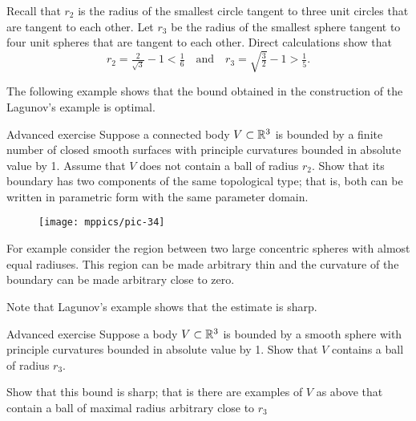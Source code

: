 Recall that $r_2$ is the radius of the smallest circle tangent to three unit circles that are tangent to each other.
Let $r_3$
be the radius of the smallest sphere tangent to four unit spheres that are tangent to each other.
Direct calculations show that 
\[r_2=\tfrac2{\sqrt{3}}-1< \tfrac16\quad\text{and}\quad r_3=\sqrt{\tfrac32}-1>\tfrac15.\]

The following example shows that the bound obtained in the construction of the Lagunov's example is optimal.

\begin{thm}{Advanced exercise}\label{ex:thin}
Suppose a connected body $V\subset \mathbb{R}^3$ is bounded by a finite number of closed smooth surfaces with principle curvatures bounded in absolute value by 1.
Assume that $V$ does not contain a ball of radius $r_2$.
Show that its boundary has two components of the same topological type; 
that is, both can be written in parametric form with the same parameter domain. 
\end{thm}

\begin{wrapfigure}{o}{33 mm}
\vskip-4mm
\centering
\texttt{[image: mppics/pic-34]}
\vskip0mm
\end{wrapfigure}

For example consider the region between two large concentric spheres with almost equal radiuses. 
This region can be made arbitrary thin and the curvature of the boundary can be made arbitrary close to zero.

Note that Lagunov's example shows that the estimate is sharp.

\begin{thm}{Advanced exercise}\label{ex:PI-sphere}
Suppose a body $V\subset \mathbb{R}^3$ is bounded by a smooth sphere with principle curvatures bounded in absolute value by 1.
Show that $V$ contains a ball of radius $r_3$.

Show that this bound is sharp; that is there are examples of $V$ as above that contain a ball of maximal radius arbitrary close to $r_3$
\end{thm}




